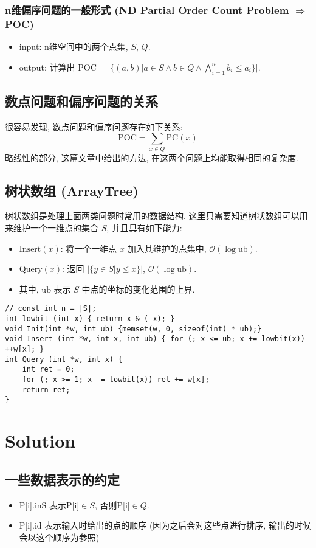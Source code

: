 \documentclass[11pt]{article}
\begin{document}
\subsubsection{n维偏序问题的一般形式 (ND Partial Order Count Problem \(\Rightarrow\) POC)}
\label{sec:orgaf7d76b}
\begin{itemize}
\item input: n维空间中的两个点集, \(S\), \(Q\).
\item output: 计算出 \(\mbox{POC} = |\{ (a, b) | a\in S\land b\in Q\land\bigwedge_{i=1}^n b_i\leq a_i\}|\).
\end{itemize}
\subsection{数点问题和偏序问题的关系}
\label{sec:org486e246}
很容易发现, 数点问题和偏序问题存在如下关系:
\[
    \mbox{POC} = \sum_{x \in Q} \mbox{PC}(x)
   \]
略线性的部分, 这篇文章中给出的方法, 在这两个问题上均能取得相同的复杂度.
\subsection{树状数组 (ArrayTree)}
\label{sec:orgf9255e1}
树状数组是处理上面两类问题时常用的数据结构.
这里只需要知道树状数组可以用来维护一个一维点的集合 \(S\), 并且具有如下能力:
\begin{itemize}
\item \(\mbox{Insert}(x)\): 将一个一维点 \(x\) 加入其维护的点集中, \(\mathcal{O}(\log \mbox{ub})\).
\item \(\mbox{Query}(x)\): 返回 \(|\{y\in S| y\leq x\}|\), \(\mathcal{O}(\log \mbox{ub})\).
\item 其中, \(\mbox{ub}\) 表示 \(S\) 中点的坐标的变化范围的上界.
\end{itemize}
\begin{verbatim}
// const int n = |S|;
int lowbit (int x) { return x & (-x); }
void Init(int *w, int ub) {memset(w, 0, sizeof(int) * ub);}
void Insert (int *w, int x, int ub) { for (; x <= ub; x += lowbit(x)) ++w[x]; }
int Query (int *w, int x) { 
    int ret = 0;
    for (; x >= 1; x -= lowbit(x)) ret += w[x];
    return ret;
}
\end{verbatim}

\section{Solution}
\label{sec:orgb782e7c}
\subsection{一些数据表示的约定}
\label{sec:org5d30920}
\begin{itemize}
\item P[i].inS 表示P[i]\(\in S\), 否则P[i]\(\in Q\).
\item P[i].id 表示输入时给出的点的顺序 (因为之后会对这些点进行排序, 输出的时候会以这个顺序为参照)
\end{itemize}
\end{document}
